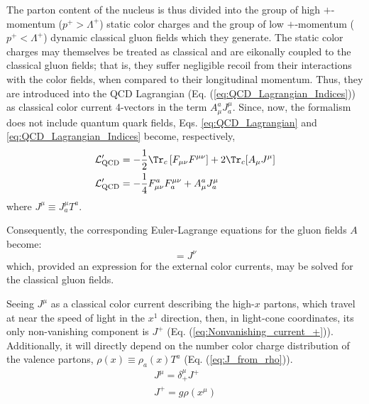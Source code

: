 The parton content of the nucleus is thus divided into the group of high $+$-momentum ($p^+ > \Lambda^+$) static color charges and the group of low $+$-momentum ($p^+ < \Lambda^+$) dynamic classical gluon fields which they generate. The static color charges may themselves be treated as classical \citep{Albacete_2014,McLerran_1994_classic_source} 
 and are eikonally coupled to the classical gluon fields; that is, they suffer negligible recoil from their interactions with the color fields, when compared to their longitudinal momentum.\cite{Gelis_2010} Thus, they are introduced into the \gls{QCD} Lagrangian (Eq. (\ref{eq:QCD_Lagrangian_Indices})) as classical color current 4-vectors in the term $A_\mu^a J^\mu_a$. Since, now, the formalism does not include quantum quark fields, Eqs. \ref{eq:QCD_Lagrangian} and \ref{eq:QCD_Lagrangian_Indices} become, respectively,%
\begin{align}
	\mathcal{L}_\text{QCD}' & = - \frac{1}{2} \Tr_c \left[ F_{\mu \nu} F^{\mu \nu} \right] + 2 \Tr_c [A_\mu J^\mu] \\
	\mathcal{L}_\text{QCD}' & =  - \frac{1}{4} F_{\mu \nu}^a F^{\mu \nu}_a + A_\mu^a J^\mu_a
\end{align}
where $J^\mu \equiv J^\mu_a T^a$.

Consequently, the corresponding Euler-Lagrange equations for the gluon fields $A$ become:
\begin{equation}
	[D_\mu, F^{\mu \nu}] = J^\nu
\end{equation}
which, provided an expression for the external color currents, may be solved for the classical gluon fields.

Seeing $J^\mu$ as a classical color current describing the high-$x$ partons, which travel at near the speed of light in the $x^1$ direction, then, in light-cone coordinates, its only non-vanishing component is $J^+$ (Eq. (\ref{eq:Nonvanishing_current_+})). Additionally, it will directly depend on the number color charge distribution of the valence partons, $\rho (x) \equiv \rho_a(x) T^a$ (Eq. (\ref{eq:J_from_rho})).
\begin{gather}
	J^\mu = \delta^\mu_+ J^+ \label{eq:Nonvanishing_current_+} \\
	J^+ = g \rho (x^\mu) \label{eq:J_from_rho}
\end{gather}

